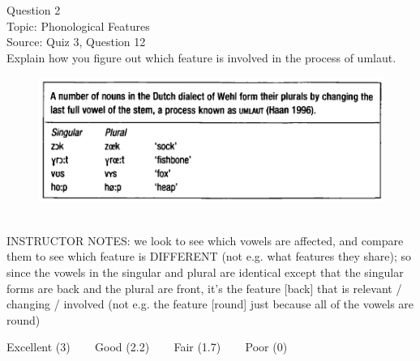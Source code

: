 \documentclass[12pt]{article}
\begin{document}
{\large Question 2}\\

Topic: Phonological Features\\
Source: Quiz 3, Question 12\\

Explain how you figure out which feature is involved in the process of umlaut.\\

\begin{figure}[H]
\includegraphics{../images/dutch.png}
\end{figure}

~\\
INSTRUCTOR NOTES: we look to see which vowels are affected, and compare them to see which feature is DIFFERENT (not e.g. what features they share); so since the vowels in the singular and plural are identical except that the singular forms are back and the plural are front, it's the feature [back] that is relevant / changing / involved (not e.g. the feature [round] just because all of the vowels are round)


\vfill
Excellent (3) ~~~ Good (2.2) ~~~ Fair (1.7) ~~~ Poor (0)
\newpage

\begin{center}
\textbf{{\color{red}{\HUGE END OF EXAM}}}\\

\end{center}
\newpage

\begin{center}
\textbf{{\color{blue}{\HUGE START OF EXAM\\}}}

\textbf{{\color{blue}{\HUGE Student ID: empty\\}}}

\textbf{{\color{blue}{\HUGE 9:20\\}}}

\end{center}
\newpage

\begin{center}
\textbf{{\color{blue}{\HUGE START OF EXAM\\}}}

\textbf{{\color{blue}{\HUGE Student ID: 54112\\}}}

\textbf{{\color{blue}{\HUGE 9:30\\}}}

\end{center}
\newpage
\end{document}
